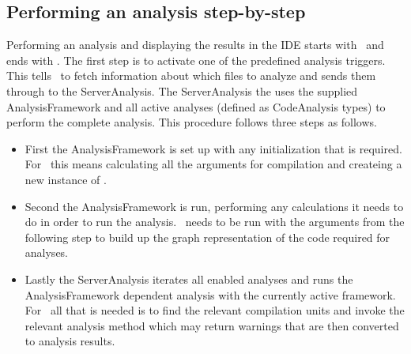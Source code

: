 \documentclass[sigplan,10pt]{acmart}
\begin{document}
\subsection{Performing an analysis step-by-step}

Performing an analysis and displaying the results in the IDE starts with \magpie\ and ends with \magpie. The first step is to activate one of the predefined analysis triggers. This tells \magpie\ to fetch information about which files to analyze and sends them through to the ServerAnalysis. The ServerAnalysis the uses the supplied AnalysisFramework and all active analyses (defined as CodeAnalysis types) to perform the complete analysis. This procedure follows three steps as follows.
\begin{itemize}
    \item First the AnalysisFramework is set up with any initialization that is required. For \intraj\ this means calculating all the arguments for compilation and createing a new instance of \intraj.
    \item Second the AnalysisFramework is run, performing any calculations it needs to do in order to run the analysis. \intraj\ needs to be run with the arguments from the following step to build up the graph representation of the code required for analyses.
    \item Lastly the ServerAnalysis iterates all enabled analyses and runs the AnalysisFramework dependent analysis with the currently active framework. For \intraj\ all that is needed is to find the relevant compilation units and invoke the relevant analysis method which may return warnings that are then converted to analysis results.
\end{itemize}
\end{document}
